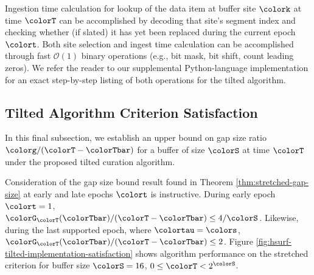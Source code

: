 Ingestion time calculation for lookup of the data item at buffer site $\colork$ at time $\colorT$ can be accomplished by decoding that site's segment index and checking whether (if slated) it has yet been replaced during the current epoch $\colort$.
Both site selection and ingest time calculation can be accomplished through fast $\mathcal{O}(1)$ binary operations (e.g., bit mask, bit shift, count leading zeros).
We refer the reader to our supplemental Python-language implementation for an exact step-by-step listing of both operations for the tilted algorithm.

\subsection{Tilted Algorithm Criterion Satisfaction}
\label{sec:tilted-satisfaction}

In this final subsection, we establish an upper bound on gap size ratio $\colorg/(\colorT - \colorTbar)$ for a buffer of size $\colorS$ at time $\colorT$ under the proposed tilted curation algorithm.



Consideration of the gap size bound result found in Theorem \ref{thm:stretched-gap-size} at early and late epochs $\colort$ is instructive.
During early epoch $\colort = 1$, $\colorG_{\colorT}(\colorTbar)/(\colorT - \colorTbar) \leq 4/\colorS$.
Likewise, during the last supported epoch, where $\colortau = \colors$, $\colorG_{\colorT}(\colorTbar)/(\colorT - \colorTbar) \leq 2$.
Figure \ref{fig:hsurf-tilted-implementation-satisfaction} shows algorithm performance on the stretched criterion for buffer size $\colorS=16$, $0 \leq \colorT < 2^{\colorS}$.
